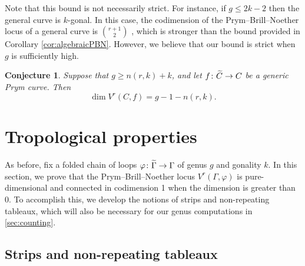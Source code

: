 \documentclass[11pt,reqno]{amsart}
\newcommand*{\maps}{\nobreak\mskip2mu\mathpunct{}\nonscript
  \mkern-\thinmuskip{:}\mskip6muplus1mu\relax}
\newcommand*{\wti}[1]{\widetilde{#1}}
\newcommand{\yoav}[1]{{\color{blue} \sf  Yo$\alpha$v: [#1]}}
\newcommand{\caelan}[1]{\textcolor{orange}{\sf C: [#1]}}
\theoremstyle{definition}
\theoremstyle{problem}
\theoremstyle{plain}
\newtheorem{conjecture}[definition]{Conjecture}
\theoremstyle{remark}
\theoremstyle{theorem}
\numberwithin{equation}{section}
\numberwithin{figure}{section}
\begin{document}
Note that this bound is not necessarily strict. For instance, if
$g\leq 2k-2$ then the general curve is $k$-gonal. In this case, the
codimension of the Prym--Brill--Noether locus of a general curve is
$\binom{r+1}{2}$ \cite{Welters_Prym}, which is stronger than the bound
provided in Corollary \ref{cor:algebraicPBN}.  However, we believe
that our bound is strict when $g$ is sufficiently high.

\begin{conjecture}
  Suppose that $g\geq n(r,k) + k$, and let $f\maps\wti{C}\to C$ be a
  generic Prym curve. Then
  \begin{equation*}
    \label{eq:2}
    \dim V^r(C,f) = g-1-n(r,k).
  \end{equation*}
\end{conjecture}

\section{Tropological properties}\label{sec:trop-results}

As before, fix a folded chain of loops
$\varphi\maps\wti\Gamma\to\Gamma$ of genus $g$ and gonality $k$.  In
this section, we prove that the Prym--Brill--Noether locus
$V^r(\Gamma,\varphi)$ is pure-dimensional and connected in codimension
1 when the dimension is greater than 0.  To accomplish this, we
develop the notions of strips and non-repeating tableaux, which will
also be necessary for our genus computations in \cref{sec:counting}.

\subsection{Strips and non-repeating tableaux}\label{sec:an-interl}

\end{document}
